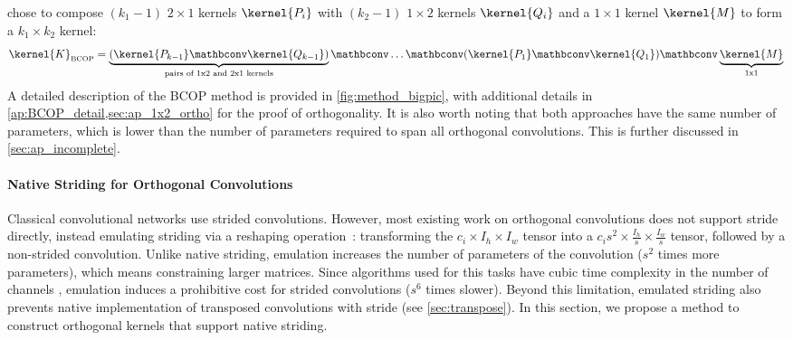     \cite{li_preventing_2019, xiao_dynamical_2018} chose to compose $(k_1-1)$ $2 \times 1$ kernels $\kernel{P_i}$ with $(k_2-1)$ $1 \times 2$ kernels $\kernel{Q_i}$ and a $1 \times 1$ kernel $\kernel{M}$ to form a $k_1 \times k_2$ kernel:
    \[
        \kernel{K}_{\text{\tiny{BCOP}}} = \underbrace{(\kernel{P_{k-1}} \mathbconv \kernel{Q_{k-1}})}_{\text{pairs of 1x2 and 2x1 kernels}} \mathbconv \dots \mathbconv (\kernel{P_1} \mathbconv \kernel{Q_1}) \mathbconv \underbrace{\kernel{M}}_{\text{1x1}}
    \] 
     A detailed description of the BCOP method is provided in \cref{fig:method_bigpic}, with additional details in  \cref{ap:BCOP_detail,sec:ap_1x2_ortho} for the proof of orthogonality.
    It is also worth noting that both approaches have the same number of parameters, which is lower than the number of parameters required to span all orthogonal convolutions. This is further discussed in  \cref{sec:ap_incomplete}.


\paragraph{Native Striding for Orthogonal Convolutions}\label{sec:stride}

     Classical convolutional networks use strided convolutions. However, most existing work on orthogonal convolutions does not support stride directly, instead emulating striding via a reshaping operation~\cite{shi2016real}: transforming the $c_i \times I_h \times I_w$ tensor into a $c_i s^2 \times \frac{I_h}{s} \times \frac{I_w}{s}$ tensor, followed by a non-strided convolution. Unlike native striding, emulation increases the number of parameters of the convolution ($s^2$ times more parameters), which means constraining larger matrices. Since algorithms used for this tasks have cubic time complexity in the number of channels \cite{prach_1-lipschitz_2023}, emulation induces a prohibitive cost for strided convolutions ($s^6$ times slower). Beyond this limitation, emulated striding also prevents native implementation of transposed convolutions with stride (see \cref{sec:transpose}). In this section, we propose a method to construct orthogonal kernels that support native striding.

